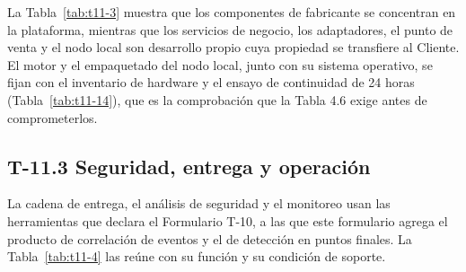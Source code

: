\documentclass[11pt]{article}
\begin{document}
La Tabla~\mbox{\ref{tab:t11-3}} muestra que los componentes de fabricante se concentran en la plataforma, mientras que los servicios de negocio, los adaptadores, el punto de venta y el nodo local son desarrollo propio cuya propiedad se transfiere al Cliente. El motor y el empaquetado del nodo local, junto con su sistema operativo, se fijan con el inventario de hardware y el ensayo de continuidad de 24 horas (Tabla~\mbox{\ref{tab:t11-14}}), que es la comprobación que la Tabla 4.6 exige antes de comprometerlos.

\subsection{T-11.3 Seguridad, entrega y operación}\label{t-11-3}

La cadena de entrega, el análisis de seguridad y el monitoreo usan las herramientas que declara el Formulario T-10, a las que este formulario agrega el producto de correlación de eventos y el de detección en puntos finales. La Tabla~\mbox{\ref{tab:t11-4}} las reúne con su función y su condición de soporte.
\end{document}

